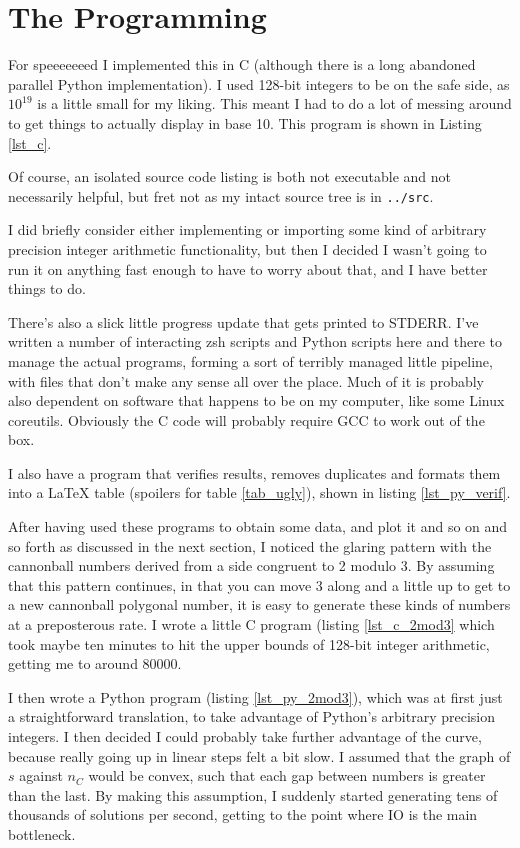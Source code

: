 \section{The Programming}

For speeeeeeed I implemented this in C (although there is a long abandoned
parallel Python implementation). I used 128-bit integers to be on the safe side,
as \(10^{19}\) is a little small for my liking. This meant I had to do a lot of
messing around to get things to actually display in base 10. This program is
shown in Listing \ref{lst_c}.

Of course, an isolated source code listing is both not executable and not
necessarily helpful, but fret not as my intact source tree is in
\texttt{../src}.

I did briefly consider either implementing or importing some kind of arbitrary
precision integer arithmetic functionality, but then I decided I wasn't going to
run it on anything fast enough to have to worry about that, and I have better
things to do.

There's also a slick little progress update that gets printed to STDERR. I've
written a number of interacting zsh scripts and Python scripts here and there to
manage the actual programs, forming a sort of terribly managed little pipeline,
with files that don't make any sense all over the place. Much of it is probably
also dependent on software that happens to be on my computer, like some Linux
coreutils. Obviously the C code will probably require GCC to work out of the
box.

I also have a program that verifies results, removes duplicates and formats them
into a \LaTeX{} table (spoilers for table \ref{tab_ugly}), shown in listing
\ref{lst_py_verif}.

After having used these programs to obtain some data, and plot it and so on and
so forth as discussed in the next section, I noticed the glaring pattern with
the cannonball numbers derived from a side congruent to 2 modulo 3. By
assuming that this pattern continues, in that you can move 3 along and a little
up to get to a new cannonball polygonal number, it is easy to generate these
kinds of numbers at a preposterous rate. I wrote a little C program (listing
\ref{lst_c_2mod3} which took maybe ten minutes to hit the upper bounds of
128-bit integer arithmetic, getting me to around 80000.

I then wrote a Python program (listing \ref{lst_py_2mod3}), which was at first
just a straightforward translation, to take advantage of Python's arbitrary
precision integers. I then decided I could probably take further advantage of
the curve, because really going up in linear steps felt a bit slow. I assumed
that the graph of \(s\) against \(n_C\) would be convex, such that each gap
between numbers is greater than the last. By making this assumption, I suddenly
started generating tens of thousands of solutions per second, getting to the
point where IO is the main bottleneck.


